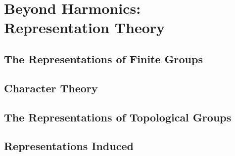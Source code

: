 \documentclass[../master.tex]{subfiles}
\begin{document}
\chapter[Beyond Harmonics: Representation Theory]{Beyond Harmonics:\\ Representation Theory}

\section{The Representations of Finite Groups} %
\label{sec:the_representations_of_finite_groups}


\section{Character Theory} %
\label{sec:character_theory}


\section{The Representations of Topological Groups} %
\label{sec:the_representations_of_topological_groups}


\section{Representations Induced} %
\label{sec:representations_induced}

\end{document}
